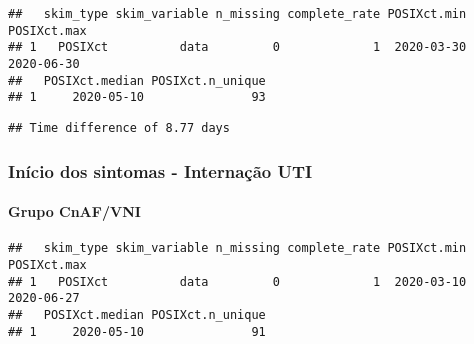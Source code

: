 \documentclass[
]{article}
\newenvironment{Shaded}{\begin{snugshade}}{\end{snugshade}}
\newcommand{\AttributeTok}[1]{\textcolor[rgb]{0.77,0.63,0.00}{#1}}
\newcommand{\FunctionTok}[1]{\textcolor[rgb]{0.00,0.00,0.00}{#1}}
\newcommand{\NormalTok}[1]{#1}
\newcommand{\SpecialCharTok}[1]{\textcolor[rgb]{0.00,0.00,0.00}{#1}}
\newcommand{\StringTok}[1]{\textcolor[rgb]{0.31,0.60,0.02}{#1}}
\begin{document}
\begin{verbatim}
##   skim_type skim_variable n_missing complete_rate POSIXct.min POSIXct.max
## 1   POSIXct          data         0             1  2020-03-30  2020-06-30
##   POSIXct.median POSIXct.n_unique
## 1     2020-05-10               93
\end{verbatim}

\begin{Shaded}
\end{Shaded}

\begin{verbatim}
## Time difference of 8.77 days
\end{verbatim}

\hypertarget{inuxedcio-dos-sintomas---internauxe7uxe3o-uti}{%
\subsubsection{\texorpdfstring{\textbf{Início dos sintomas - Internação
UTI}}{Início dos sintomas - Internação UTI}}\label{inuxedcio-dos-sintomas---internauxe7uxe3o-uti}}

\hypertarget{grupo-cnafvni-1}{%
\paragraph{\texorpdfstring{\textbf{Grupo
CnAF/VNI}}{Grupo CnAF/VNI}}\label{grupo-cnafvni-1}}

\begin{Shaded}
\end{Shaded}

\begin{verbatim}
##   skim_type skim_variable n_missing complete_rate POSIXct.min POSIXct.max
## 1   POSIXct          data         0             1  2020-03-10  2020-06-27
##   POSIXct.median POSIXct.n_unique
## 1     2020-05-10               91
\end{verbatim}
\end{document}

